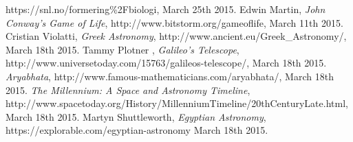 \begin{thebibliography}{99}
		https://snl.no/formering\%2Fbiologi,
		March 25th 2015.
		Edwin Martin,
		\emph{John Conway's Game of Life},
		http://www.bitstorm.org/gameoflife,
		March 11th 2015.
		Cristian Violatti,
		\emph{Greek Astronomy},
		http://www.ancient.eu/Greek\_Astronomy/,
		March 18th 2015.
		Tammy Plotner ,
		\emph{Galileo's Telescope},
		http://www.universetoday.com/15763/galileos-telescope/,
		March 18th 2015.
		\emph{Aryabhata},
		http://www.famous-mathematicians.com/aryabhata/,
		March 18th 2015.
		\emph{The Millennium: A Space and Astronomy Timeline},
		http://www.spacetoday.org/History/MillenniumTimeline/20thCenturyLate.html,
		March 18th 2015.
		Martyn Shuttleworth,
		\emph{Egyptian Astronomy},
		https://explorable.com/egyptian-astronomy
		March 18th 2015.
\end{thebibliography}